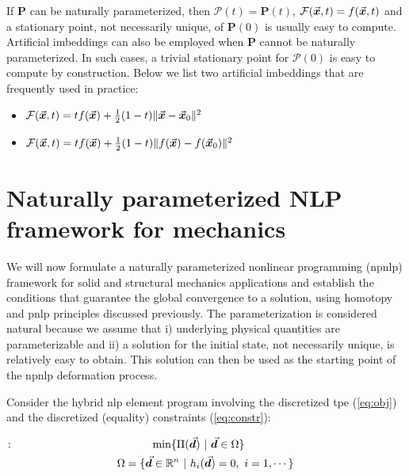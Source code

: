 \noindent If \textbf{P} can be naturally parameterized, then
$\bm{\mathcal{P}}(t)=$\textbf{P}$(t)$,
$\mathcal{F}(\vec{\bm{x}},t)=f(\vec{\bm{x}},t)$ and a stationary point, not necessarily
unique, of \textbf{P}$(0)$ is usually easy to compute. Artificial imbeddings can
also be employed when \textbf{P} cannot be naturally parameterized. In such
cases, a trivial stationary point for
$\bm{\mathcal{P}}(0)$ is easy to compute by construction. Below we list two 
artificial
imbeddings that are frequently used in practice:
\begin{itemize}
	\item $\mathcal{F}(\vec{\bm{x}},t) = t f(\vec{\bm{x}})+\frac{1}{2}(1-t)\Vert
	\vec{\bm{x}}-\vec{\bm{x}}_0\Vert ^2$
	\item $\mathcal{F}(\vec{\bm{x}},t) = t f(\vec{\bm{x}})+\frac{1}{2}(1-t)\Vert
	f(\vec{\bm{x}})-f(\vec{\bm{x}}_0)\Vert ^2$
\end{itemize}


\section{Naturally parameterized NLP framework for mechanics}\label{CH4-S2}

We will now formulate a naturally parameterized nonlinear programming 
(\acrshort{npnlp})
framework for solid and structural mechanics applications and establish the
conditions that guarantee the global convergence to a solution, using homotopy
and \acrshort{pnlp} principles discussed previously. The parameterization is 
considered 
natural 
because we assume that i) underlying physical quantities are parameterizable and
ii) a solution for the initial state, not necessarily unique, is relatively 
easy to obtain. This solution can then be used as the starting point of the 
\acrshort{npnlp} deformation process. 

Consider the hybrid \acrshort{nlp} element program involving the discretized 
\acrshort{tpe} (\ref{eq:obj}) and the 
discretized (equality) constraints (\ref{eq:constr}):

\begin{subequations}
	\begin{gather}
		\hspace*{-5.4cm}\bmat{P}: \hspace*{4.4cm}
		\text{min}\{\Pi(\bvec{d}) \ |\
		\bvec{d}\in\Omega\}
		\label{eq:TPENP_ELEM}\\
		\Omega=\{\bvec{d}\in\mathbb{R}^n\ |\ h_i(\bvec{d})=0,\ i=1,\cdots \}
		\label{eq:NPNLPDOM_ELEM}
	\end{gather}
	\label{eq:NLP_ELEM}
\end{subequations}


